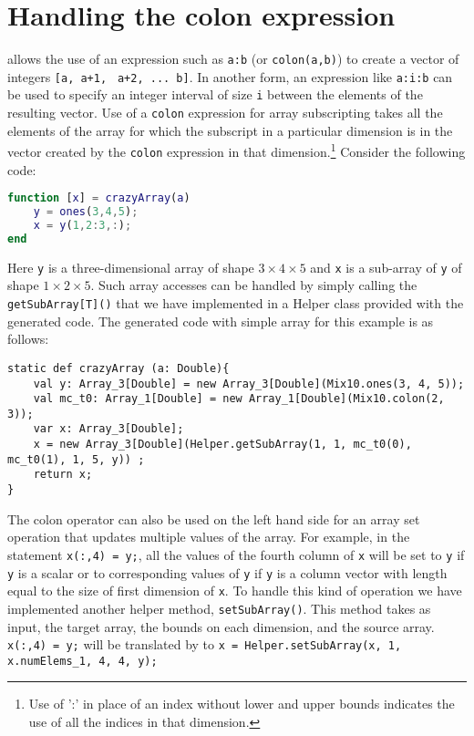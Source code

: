 \section{Handling the colon expression}

\matlab allows the use of an expression such as \verb|a:b| (or
\texttt{colon(a,b)}) to create a vector of integers 
\verb|[a, a+1,| \verb| a+2, ... b]|. In another form, an expression like 
\verb|a:i:b| can be used to
specify an integer interval of size \verb|i| between the elements of the
resulting vector. Use of a \verb|colon| expression for
array subscripting takes all the elements of the array for
which the subscript in a particular dimension is in the vector
created by the \verb|colon| expression in that
dimension.\footnote{Use of ':' in place of an index without lower and
upper bounds indicates the use of all the indices in that dimension.}
Consider the following \matlab code:

\begin{lstlisting}[language=Matlab,numbers=none]                                
function [x] = crazyArray(a)                                                    
    y = ones(3,4,5);                                                            
    x = y(1,2:3,:);                                                             
end                                                                             
\end{lstlisting}

\noindent
Here \verb|y| is a three-dimensional array of shape $3\times4\times5$ and
\verb|x| is a sub-array of \verb|y| of shape $1\times2\times5$. 
Such array accesses can be handled by simply calling the \verb|getSubArray[T]()|
that we have implemented in a Helper class provided with the generated code. 
The generated \xten code with simple array for this example is as follows:

\begin{lstlisting}[language=x10,numbers=none]                                
static def crazyArray (a: Double){
    val y: Array_3[Double] = new Array_3[Double](Mix10.ones(3, 4, 5));
    val mc_t0: Array_1[Double] = new Array_1[Double](Mix10.colon(2, 3));
    var x: Array_3[Double];
    x = new Array_3[Double](Helper.getSubArray(1, 1, mc_t0(0), mc_t0(1), 1, 5, y)) ;
    return x;
}
\end{lstlisting}

The colon operator can also be used on the left hand side for an array set
operation that updates multiple values of the array. For example, in the
\matlab statement \texttt{x(:,4) = y;}, all the values of the fourth column of
\verb|x| will be set to \verb|y| if \verb|y| is a scalar or to corresponding
values of \verb|y| if \verb|y| is a column vector with length equal to the size
of first dimension of \verb|x|. To handle this kind of operation we have
implemented another helper method, \texttt{setSubArray()}. This method takes as
input, the target array, the bounds on each dimension, and the source array.
\texttt{x(:,4) = y;} will be translated by \mixten to \texttt{x =
Helper.setSubArray(x, 1, x.numElems\_1, 4, 4, y);}

